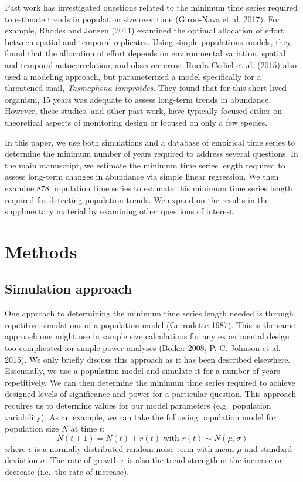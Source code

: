 \documentclass[12pt,]{article}
\begin{document}
Past work has investigated questions related to the minimum time series
required to estimate trends in population size over time (Giron-Nava et
al. 2017). For example, Rhodes and Jonzen (2011) examined the optimal
allocation of effort between spatial and temporal replicates. Using
simple populations models, they found that the allocation of effort
depends on environmental variation, spatial and temporal
autocorrelation, and observer error. Rueda-Cediel et al. (2015) also
used a modeling approach, but parameterized a model specifically for a
threatened snail, \emph{Tasmaphena lamproides}. They found that for this
short-lived organism, 15 years was adequate to assess long-term trends
in abundance. However, these studies, and other past work, have
typically focused either on theoretical aspects of monitoring design or
focused on only a few species.

In this paper, we use both simulations and a database of empirical time
series to determine the minimum number of years required to address
several questions. In the main manuscript, we estimate the minimum time
series length required to assess long-term changes in abundance via
simple linear regression. We then examine 878 population time series to
estimate this minimum time series length required for detecting
population trends. We expand on the results in the supplmentary material
by examining other questions of interest.

\section{Methods}\label{methods}

\subsection{Simulation approach}\label{simulation-approach}

One approach to determining the minimum time series length needed is
through repetitive simulations of a population model (Gerrodette 1987).
This is the same approach one might use in sample size calculations for
any experimental design too complicated for simple power analyses
(Bolker 2008; P. C. Johnson et al. 2015). We only briefly discuss this
approach as it has been described elsewhere. Essentially, we use a
population model and simulate it for a number of years repetitively. We
can then determine the minimum time series required to achieve designed
levels of significance and power for a particular question. This
approach requires us to determine values for our model parameters
(e.g.~population variability). As an example, we can take the following
population model for population size \(N\) at time \(t\): \[
N(t + 1) = N(t) + r(t) \mbox{ with } r(t) \sim N(\mu, \sigma)
\] where \(\epsilon\) is a normally-distributed random noise term with
mean \(\mu\) and standard deviation \(\sigma\). The rate of growth \(r\)
is also the trend strength of the increase or decrease (i.e.~the rate of
increase).
\end{document}
